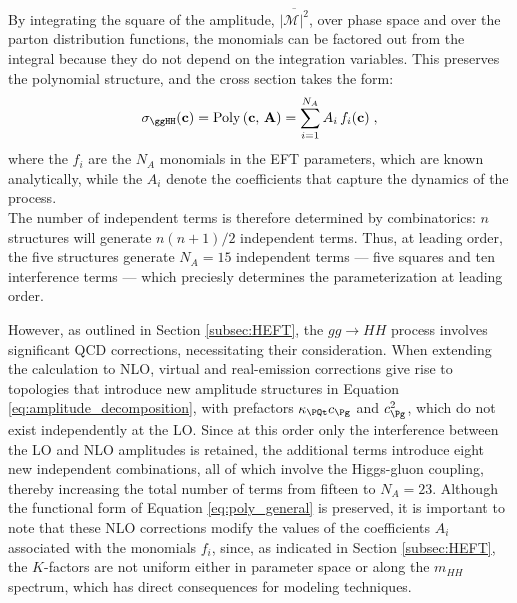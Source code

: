 By integrating the square of the amplitude, $\overline{\left|\mathcal{M}\right|^{2}}$, over phase space and over the parton distribution functions, the monomials can be factored out from the integral because they do not depend on the integration variables. This preserves the polynomial structure, and the cross section takes the form:
%
\begin{equation}
    \sigma_{\ggHH}(\mathbf{c}) = \mathrm{Poly}\left(\mathbf{c},\,\mathbf{A}\right)
    = \sum_{i=1}^{N_A} A_i\, f_i(\mathbf{c})\;,
\label{eq:poly_general}
\end{equation}
where the $f_i$ are the $N_A$ monomials in the EFT parameters, which are known analytically, while the $A_i$ denote the coefficients that capture the dynamics of the process.\\

The number of independent terms is therefore determined by combinatorics: $n$ structures will generate $n(n+1)/2$ independent terms. Thus, at leading order, the five structures generate $N_A=15$ independent terms — five squares and ten interference terms — which preciesly determines the parameterization at leading order.

However, as outlined in Section \ref{subsec:HEFT}, the $gg\to HH$ process involves significant QCD corrections, necessitating their consideration. When extending the calculation to NLO, virtual and real-emission corrections give rise to topologies that introduce new amplitude structures in Equation \ref{eq:amplitude_decomposition}, with prefactors $\kappa_{\PQt}c_{\Pg}$ and $c_{\Pg}^{2}$,
which do not exist independently at the LO. Since at this order only the interference between the LO and NLO amplitudes is retained, the additional terms introduce eight new independent combinations, all of which involve the Higgs-gluon coupling, thereby increasing the total number of terms from fifteen to $N_A = 23$. Although the functional form of Equation \ref{eq:poly_general} is preserved, it is important to note that these NLO corrections modify the values of the coefficients $A_i$ associated with the monomials $f_i$, since, as indicated in Section \ref{subsec:HEFT}, the $K$-factors are not uniform either in parameter space or along the $m_{HH}$ spectrum, which has direct consequences for modeling techniques.\\



